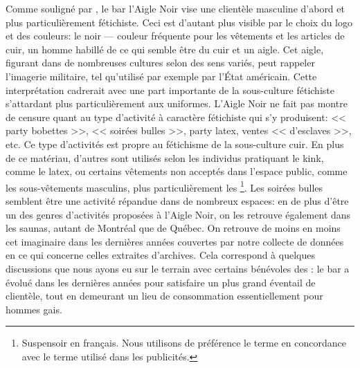 Comme souligné par \citet{Giraud2013a}, le bar l'Aigle Noir vise une clientèle masculine d'abord et plus particulièrement fétichiste.
Ceci est d'autant plus visible par le choix du logo et des couleurs: le noir --- couleur fréquente pour les vêtements et les articles de cuir, un homme habillé de ce qui semble être du cuir et un aigle.
Cet aigle, figurant dans de nombreuses cultures selon des sens variés, peut rappeler l'imagerie militaire, tel qu'utilisé par exemple par l'État américain.
Cette interprétation cadrerait avec une part importante de la sous-culture fétichiste s'attardant plus particulièrement aux uniformes.
L'Aigle Noir ne fait pas montre de censure quant au type d'activité à caractère fétichiste qui s'y produisent: << party bobettes >>, << soirées bulles >>, party latex, ventes << d'esclaves >>, etc.
Ce type d'activités est propre au fétichisme de la sous-culture cuir.
En plus de ce matériau, d'autres sont utilisés selon les individus pratiquant le kink, comme le latex, ou certains vêtements non acceptés dans l'espace public, comme les sous-vêtements masculins, plus particulièrement les \footnote{Suspensoir en français. Nous utilisons de préférence le terme  en concordance avec le terme utilisé dans les publicités.}.
Les soirées bulles semblent être une activité répandue dans de nombreux espaces: en de plus d'être un des genres d'activités proposées à l'Aigle Noir, on les retrouve également dans les saunas, autant de Montréal que de Québec.
On retrouve de moins en moins cet imaginaire dans les dernières années couvertes par notre collecte de données en ce qui concerne celles extraites d'archives.
Cela correspond à quelques discussions que nous ayons eu sur le terrain avec certains bénévoles des \agq{}: le bar a évolué dans les dernières années pour satisfaire un plus grand éventail de clientèle, tout en demeurant un lieu de consommation essentiellement pour hommes gais.

